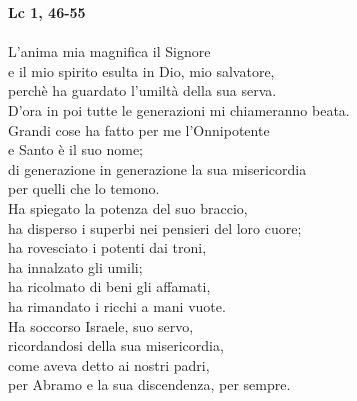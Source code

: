 \documentclass[landscape]{article}
\begin{document}
\pagestyle{empty}

\hspace{-4cm}

\huge
\LobsterTwo

\begin{multicols}{2}
\textbf{Lc 1, 46-55}\\\\
\noindent L'anima mia magnifica il Signore\\
e il mio spirito esulta in Dio, mio salvatore,\\
perch\`e ha guardato l'umilt\`a della sua serva.\\
D'ora in poi tutte le generazioni mi chiameranno beata.\\
Grandi cose ha fatto per me l'Onnipotente\\
e Santo \`e il suo nome;\\
di generazione in generazione la sua misericordia\\
per quelli che lo temono.\\
Ha spiegato la potenza del suo braccio,\\
ha disperso i superbi nei pensieri del loro cuore;\\
ha rovesciato i potenti dai troni,\\
ha innalzato gli umili;\\
ha ricolmato di beni gli affamati,\\
ha rimandato i ricchi a mani vuote.\\
Ha soccorso Israele, suo servo,\\
ricordandosi della sua misericordia,\\
come aveva detto ai nostri padri,\\
per Abramo e la sua discendenza, per sempre.\\\\


\end{multicols}
\end{document}
